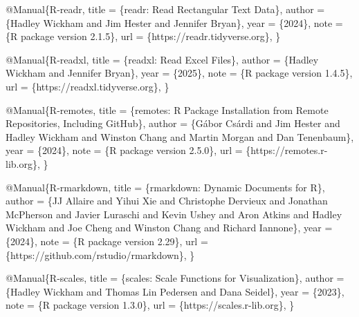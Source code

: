 \documentclass[
]{article}
\newenvironment{Shaded}{\begin{snugshade}}{\end{snugshade}}
\newcommand{\DataTypeTok}[1]{\textcolor[rgb]{0.13,0.29,0.53}{#1}}
\newcommand{\NormalTok}[1]{#1}
\newcommand{\OtherTok}[1]{\textcolor[rgb]{0.56,0.35,0.01}{#1}}
\newcommand{\VariableTok}[1]{\textcolor[rgb]{0.00,0.00,0.00}{#1}}
\begin{document}
\begin{Shaded}
\begin{Highlighting}[]
\VariableTok{@Manual}\NormalTok{\{}\OtherTok{R}\NormalTok{{-}}\OtherTok{readr}\NormalTok{,}
  \DataTypeTok{title}\NormalTok{ = \{readr: Read Rectangular Text Data\},}
  \DataTypeTok{author}\NormalTok{ = \{Hadley Wickham and Jim Hester and Jennifer Bryan\},}
  \DataTypeTok{year}\NormalTok{ = \{2024\},}
  \DataTypeTok{note}\NormalTok{ = \{R package version 2.1.5\},}
  \DataTypeTok{url}\NormalTok{ = \{https://readr.tidyverse.org\},}
\NormalTok{\}}

\VariableTok{@Manual}\NormalTok{\{}\OtherTok{R}\NormalTok{{-}}\OtherTok{readxl}\NormalTok{,}
  \DataTypeTok{title}\NormalTok{ = \{readxl: Read Excel Files\},}
  \DataTypeTok{author}\NormalTok{ = \{Hadley Wickham and Jennifer Bryan\},}
  \DataTypeTok{year}\NormalTok{ = \{2025\},}
  \DataTypeTok{note}\NormalTok{ = \{R package version 1.4.5\},}
  \DataTypeTok{url}\NormalTok{ = \{https://readxl.tidyverse.org\},}
\NormalTok{\}}

\VariableTok{@Manual}\NormalTok{\{}\OtherTok{R}\NormalTok{{-}}\OtherTok{remotes}\NormalTok{,}
  \DataTypeTok{title}\NormalTok{ = \{remotes: R Package Installation from Remote Repositories, Including}
\NormalTok{GitHub\},}
  \DataTypeTok{author}\NormalTok{ = \{Gábor Csárdi and Jim Hester and Hadley Wickham and Winston Chang and Martin Morgan and Dan Tenenbaum\},}
  \DataTypeTok{year}\NormalTok{ = \{2024\},}
  \DataTypeTok{note}\NormalTok{ = \{R package version 2.5.0\},}
  \DataTypeTok{url}\NormalTok{ = \{https://remotes.r{-}lib.org\},}
\NormalTok{\}}

\VariableTok{@Manual}\NormalTok{\{}\OtherTok{R}\NormalTok{{-}}\OtherTok{rmarkdown}\NormalTok{,}
  \DataTypeTok{title}\NormalTok{ = \{rmarkdown: Dynamic Documents for R\},}
  \DataTypeTok{author}\NormalTok{ = \{JJ Allaire and Yihui Xie and Christophe Dervieux and Jonathan McPherson and Javier Luraschi and Kevin Ushey and Aron Atkins and Hadley Wickham and Joe Cheng and Winston Chang and Richard Iannone\},}
  \DataTypeTok{year}\NormalTok{ = \{2024\},}
  \DataTypeTok{note}\NormalTok{ = \{R package version 2.29\},}
  \DataTypeTok{url}\NormalTok{ = \{https://github.com/rstudio/rmarkdown\},}
\NormalTok{\}}

\VariableTok{@Manual}\NormalTok{\{}\OtherTok{R}\NormalTok{{-}}\OtherTok{scales}\NormalTok{,}
  \DataTypeTok{title}\NormalTok{ = \{scales: Scale Functions for Visualization\},}
  \DataTypeTok{author}\NormalTok{ = \{Hadley Wickham and Thomas Lin Pedersen and Dana Seidel\},}
  \DataTypeTok{year}\NormalTok{ = \{2023\},}
  \DataTypeTok{note}\NormalTok{ = \{R package version 1.3.0\},}
  \DataTypeTok{url}\NormalTok{ = \{https://scales.r{-}lib.org\},}
\NormalTok{\}}


\end{Highlighting}
\end{Shaded}
\end{document}
